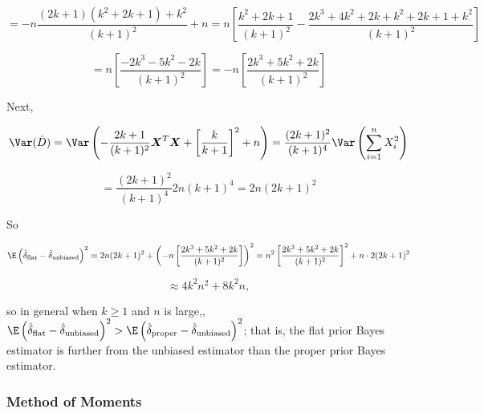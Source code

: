 \begin{solution}
\begin{enumerate}[(a)]
\[
=  -n \frac{(2k +1)(k^2 + 2k + 1) + k^2}{(k+1)^2}   + n =  n \left[ \frac{k^2 + 2k + 1}{(k+1)^2} - \frac{2k^3 + 4k^2 + 2k + k^2 + 2k + 1 + k^2}{(k+1)^2} \right]
\]

\[
=  n \left[  \frac{-2k^3 -5k^2-2k }{(k+1)^2} \right] =  -n \left[  \frac{2k^3  + 5k^2 + 2k }{(k+1)^2} \right]
\]






Next,

\[
\Var (\hat{D}) = \Var \left( - \frac{2k +1}{(k+1)^2}  \boldsymbol{X}^T\boldsymbol{X} + \left[ \frac{k}{k+1} \right]^2 + n  \right) = \frac{(2k +1)^2}{(k+1)^4}   \Var \left( \sum_{i=1}^n  X_i ^2   \right)
\]

\[
= \frac{(2k +1)^2}{(k+1)^4}   2n(k+1)^4 = 2n (2k+1)^2
\]


So

\[
\E \left( \hat{\delta}_{\text{flat}}  - \hat{\delta}_{\text{unbiased}} \right)^2 =  2n (2k+1)^2 + \left(-n \left[  \frac{2k^3  + 5k^2 + 2k }{(k+1)^2} \right] \right)^2 = n^2  \left[  \frac{2k^3  + 5k^2 + 2k }{(k+1)^2} \right] ^2 + n \cdot 2(2k+1)^2
\]

\[
\approx 4k^2 n^2 + 8k^2 n,
\]

so in general when \(k \geq 1\) and \(n\) is large,, \(\E \left( \hat{\delta}_{\text{flat}}  - \hat{\delta}_{\text{unbiased}} \right)^2 > \E \left( \hat{\delta}_{\text{proper}}  - \hat{\delta}_{\text{unbiased}} \right)^2 \); that is, the flat prior Bayes estimator is further from the unbiased estimator than the proper prior Bayes estimator.

\end{enumerate}

\end{solution}

\subsubsection{Method of Moments}

